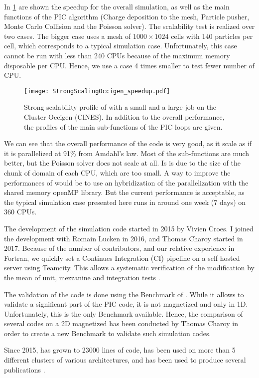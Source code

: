In \cref{fig-strongperfo} are shown the speedup for the overall simulation, as well as the main functions of the \ac{PIC} algorithm (Charge deposition to the mesh, Particle pusher, Monte Carlo Collision and the Poisson solver).
The scalability test is realized over two cases. 
The bigger case uses a mesh of $1000\times1024$ cells with $140$ particles per cell, which corresponds to a typical simulation case.
Unfortunately, this case cannot be run with less than 240 CPUs because of the maximum memory disposable per CPU. 
Hence, we use a case 4 times smaller to test fewer number of CPU.
\begin{figure}[hbtp]
  \centering
  \texttt{[image: StrongScalingOccigen\_speedup.pdf]}
  \caption{Strong scalability profile of \LPPic with a small and a large job on the Cluster Occigen (CINES). In addition to the overall performance, the profiles of the main sub-functions of the \ac{PIC} loops are given. }
  \label{fig-strongperfo}
\end{figure}

We can see that the overall performance of the code is very good, as it scale as if it is parallelized at 91\% from Amdahl's law.
Most of the sub-functions are much better, but the Poisson solver does not scale at all.
Is is due to the size of the chunk of domain of each CPU, which are too small.
A way to improve the performances of \LPPic would be to use an hybridization of the parallelization with the shared memory openMP library.
But the current performance is acceptable, as the typical simulation case presented here runs in around one week (7 days) on 360 CPUs.

\vspace{1em}

The development of the  simulation code \LPPic started in 2015 by Vivien Croes.
I joined the development with Romain Lucken in 2016, and Thomas Charoy started in 2017.
Because of the number of contributors, and our relative experience in Fortran, we quickly set a Continues Integration (CI) pipeline on a self hosted server using Teamcity.
This allows a systematic verification of the modification by the mean of unit, mezzanine and integration tests \citep{turner2016}.

The validation of the code is done using the Benchmark of \citet{turner2013}.
While it allows to validate a significant part of the \ac{PIC} code, it is not magnetized and only in \ac{1D}.
Unfortunately, this is the only Benchmark available.
Hence, the comparison of several codes on a \ac{2D} magnetized  has been conducted by Thomas Charoy in order to create a new Benchmark to validate such simulation codes.


Since 2015, \LPPic has grown to 23000 lines of code, has been used on more than 5 different clusters of various architectures, and has been used to produce several publications \citep{croes2017a,croes2018,tavant2018,tavant2019,lucken2018,lucken2019}.
